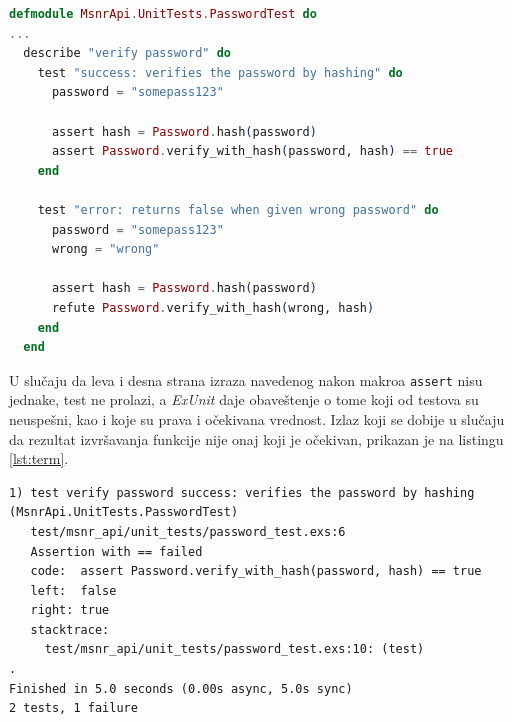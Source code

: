 \documentclass[12pt,oneside]{memoir}
\begin{document}
\begin{minipage}{\linewidth}
\begin{lstlisting}[language=elixir, basicstyle=\small, caption={Opisivanje testova unutar jedne grupe, na primeru funkcije za verifikaciju lozinke},captionpos=b, label={lst:desc}]
defmodule MsnrApi.UnitTests.PasswordTest do
...
  describe "verify password" do
    test "success: verifies the password by hashing" do
      password = "somepass123"

      assert hash = Password.hash(password)
      assert Password.verify_with_hash(password, hash) == true
    end

    test "error: returns false when given wrong password" do
      password = "somepass123"
      wrong = "wrong"

      assert hash = Password.hash(password)
      refute Password.verify_with_hash(wrong, hash)
    end
  end
\end{lstlisting}
\end{minipage}

\par U slučaju da leva i desna strana izraza navedenog nakon makroa \texttt{assert} nisu jednake, test ne prolazi, a \emph{ExUnit} daje obaveštenje o tome koji od testova su neuspešni, kao i koje su prava i očekivana vrednost. Izlaz koji se dobije u slučaju da rezultat izvršavanja funkcije nije onaj koji je očekivan, prikazan je na listingu \ref{lst:term}. \\

\begin{minipage}{\linewidth}
\begin{lstlisting}[style=DOS, caption={Izlaz u slučaju testa koji ne prolazi},captionpos=b, label={lst:term}]
1) test verify password success: verifies the password by hashing (MsnrApi.UnitTests.PasswordTest)
   test/msnr_api/unit_tests/password_test.exs:6
   Assertion with == failed
   code:  assert Password.verify_with_hash(password, hash) == true
   left:  false
   right: true
   stacktrace:
     test/msnr_api/unit_tests/password_test.exs:10: (test)
.
Finished in 5.0 seconds (0.00s async, 5.0s sync)
2 tests, 1 failure

\end{lstlisting}
\end{minipage}
\end{document}
